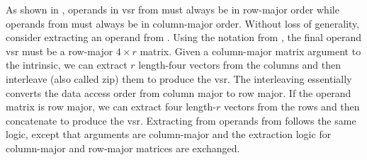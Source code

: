 \documentclass[\main/thesis.tex]{subfiles}
\begin{document}
As shown in , operands in \gls{vsr} from  must always be in row-major order while operands from  must always be in column-major order.
Without loss of generality, consider extracting an operand from .
Using the notation from , the final operand \gls{vsr} must be a row-major $4 \times r$ matrix.
Given a column-major matrix argument to the intrinsic, we can extract $r$ length-four vectors from the columns and then interleave (also called zip) them to produce the \gls{vsr}.
The interleaving essentially converts the data access order from column major to row major.
If the operand matrix is row major, we can extract four length-$r$ vectors from the rows and then concatenate to produce the \gls{vsr}.
Extracting from operands from  follows the same logic, except that arguments are column-major and the extraction logic for column-major and row-major matrices are exchanged.
\end{document}
